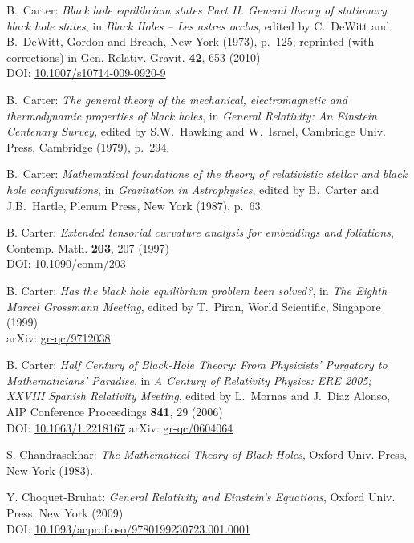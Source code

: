 \begin{thebibliography}{123}
B.~Carter:
{\em Black hole equilibrium states Part II. General theory of stationary black hole states}, in {\em Black Holes -- Les astres occlus}, edited by C.~DeWitt and B.~DeWitt,
Gordon and Breach, New York (1973), p.~125; reprinted (with corrections) in
Gen. Relativ. Gravit. {\bf 42}, 653 (2010)\\
DOI: \href{https://doi.org/10.1007/s10714-009-0920-9}{10.1007/s10714-009-0920-9}

B.~Carter:
{\em The general theory of the mechanical, electromagnetic and thermodynamic properties of black holes}, in {\em General Relativity: An Einstein Centenary Survey},
edited by S.W.~Hawking and W.~Israel,
Cambridge Univ. Press, Cambridge (1979), p.~294.

B.~Carter:
{\em Mathematical foundations of the theory of
relativistic stellar and black hole configurations},
in {\em Gravitation in Astrophysics}, edited by B.~Carter and J.B.~Hartle,
Plenum Press, New York (1987), p.~63.

B. Carter:
{\em Extended tensorial curvature analysis for embeddings and foliations},
Contemp. Math. {\bf 203}, 207 (1997)\\
DOI: \href{http://dx.doi.org/10.1090/conm/203}{10.1090/conm/203}

B. Carter: {\em Has the black hole equilibrium problem been solved?},
in {\em The Eighth Marcel Grossmann Meeting}, edited by T.~Piran,
World Scientific, Singapore (1999)\\
arXiv: \href{https://arxiv.org/abs/gr-qc/9712038}{gr-qc/9712038}

B. Carter:
{\em Half Century of Black‐Hole Theory: From Physicists' Purgatory to Mathematicians' Paradise},
in {\em A Century of Relativity Physics: ERE 2005; XXVIII Spanish Relativity Meeting},
edited by L.~Mornas and J.~Diaz Alonso,
AIP Conference Proceedings {\bf 841}, 29 (2006)\\
DOI: \href{https://doi.org/10.1063/1.2218167}{10.1063/1.2218167}\hfill
arXiv: \href{https://arxiv.org/abs/gr-qc/0604064}{gr-qc/0604064}

S. Chandrasekhar: {\em The Mathematical Theory of Black Holes},
Oxford Univ. Press, New York (1983).

Y. Choquet-Bruhat: {\em General Relativity and Einstein's Equations},
Oxford Univ. Press, New York (2009)\\
DOI: \href{https://doi.org/10.1093/acprof:oso/9780199230723.001.0001}{10.1093/acprof:oso/9780199230723.001.0001}


\end{thebibliography}
